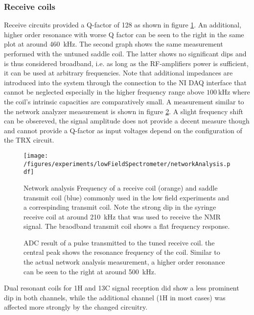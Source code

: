         \subsubsection{Receive coils}
            Receive circuits provided a Q-factor of \SI{128}{} as shown in figure \ref{fig:results:networkAnalysis}.  An additional, higher order resonance with worse Q factor can be seen to the right in the same plot at around \SI{460}{\kilo Hz}. The second graph shows the same measurement performed with the untuned saddle coil. The latter shows no significant dips and is thus considered broadband, i.e. as long as the RF-amplifiers power is sufficient, it can be used at arbitrary frequencies. Note that additional impedances are introduced into the system through the connection to the NI DAQ interface that cannot be neglected especially in the higher frequency range above $\SI{100}{\kilo\hertz}$ where the coil's intrinsic capacities are comparatively small. A measurement similar to the network analyzer measurement is shown in figure \ref{fig:results:niNetworkAnalysis}. A slight frequency shift can be obsereved, the signal amplitude does not provide a decent measure though and cannot provide a Q-factor as input voltages depend on the configuration of the TRX circuit.
            \begin{figure}
                \label{fig:results:networkAnalysis}
                \centering
                \texttt{[image: /figures/experiments/lowFieldSpectrometer/networkAnalysis.pdf]}
                \caption{Network analysis Frequency of a receive coil (orange) and saddle transmit coil (blue) commonly used in the low field experiments and a correspinding transmit coil. Note the strong dip in the syringe receive coil at around \SI{210}{\kilo\hertz} that was used to receive the NMR signal. The braodband transmit coil shows a flat frequency response.}
            \end{figure}
            \begin{figure}
                \label{fig:results:niNetworkAnalysis}
                \caption{ADC result of a pulse transmitted to the tuned receive coil. the central peak shows the resonance frequency of the coil. Similar to the actual network analysis measurement, a higher order resonance can be seen to the right at around \SI{500}{\kilo\hertz}.}
            \end{figure}
            Dual resonant coils for 1H and 13C signal reception did show a less prominent dip in both channels, while the additional channel (1H in most cases)  was affected more strongly by the changed circuitry.
